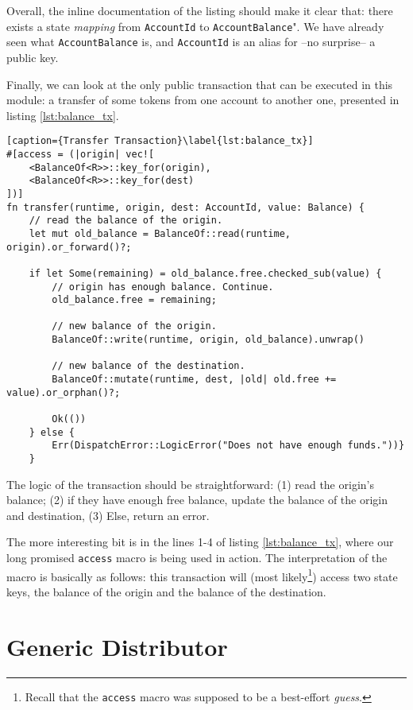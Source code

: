 Overall, the inline documentation of the listing should make it clear that: there exists a state
\textit{mapping} from \texttt{AccountId} to \texttt{AccountBalance}". We have already seen what
\texttt{AccountBalance} is, and \texttt{AccountId} is an alias for --no surprise-- a public key.

Finally, we can look at the only public transaction that can be executed in this module: a transfer
of some tokens from one account to another one, presented in listing \ref{lst:balance_tx}.

\begin{lstlisting}[caption={Transfer Transaction}\label{lst:balance_tx}]
#[access = (|origin| vec![
	<BalanceOf<R>>::key_for(origin),
	<BalanceOf<R>>::key_for(dest)
])]
fn transfer(runtime, origin, dest: AccountId, value: Balance) {
	// read the balance of the origin.
	let mut old_balance = BalanceOf::read(runtime, origin).or_forward()?;

	if let Some(remaining) = old_balance.free.checked_sub(value) {
		// origin has enough balance. Continue.
		old_balance.free = remaining;

		// new balance of the origin.
		BalanceOf::write(runtime, origin, old_balance).unwrap()

		// new balance of the destination.
		BalanceOf::mutate(runtime, dest, |old| old.free += value).or_orphan()?;

		Ok(())
	} else {
		Err(DispatchError::LogicError("Does not have enough funds."))}
	}
\end{lstlisting}

The logic of the transaction should be straightforward: (1) read the origin's balance; (2) if they
have enough free balance, update the balance of the origin and destination, (3) Else, return an
error.

The more interesting bit is in the lines 1-4 of listing \ref{lst:balance_tx}, where our long
promised \texttt{access} macro is being used in action. The interpretation of the macro is basically
as follows: this transaction will (most likely\footnote{Recall that the \texttt{access} macro was
supposed to be a best-effort \textit{guess}.}) access two state keys, the balance of the origin and
the balance of the destination.

\section{Generic Distributor}

